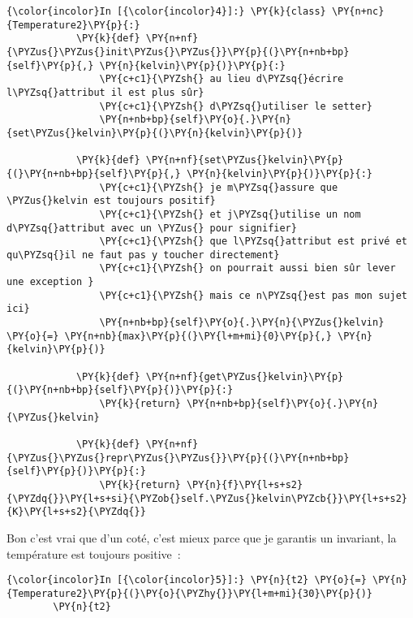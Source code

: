     \begin{Verbatim}[commandchars=\\\{\}]
{\color{incolor}In [{\color{incolor}4}]:} \PY{k}{class} \PY{n+nc}{Temperature2}\PY{p}{:}
            \PY{k}{def} \PY{n+nf}{\PYZus{}\PYZus{}init\PYZus{}\PYZus{}}\PY{p}{(}\PY{n+nb+bp}{self}\PY{p}{,} \PY{n}{kelvin}\PY{p}{)}\PY{p}{:}
                \PY{c+c1}{\PYZsh{} au lieu d\PYZsq{}écrire l\PYZsq{}attribut il est plus sûr}
                \PY{c+c1}{\PYZsh{} d\PYZsq{}utiliser le setter}
                \PY{n+nb+bp}{self}\PY{o}{.}\PY{n}{set\PYZus{}kelvin}\PY{p}{(}\PY{n}{kelvin}\PY{p}{)}
                
            \PY{k}{def} \PY{n+nf}{set\PYZus{}kelvin}\PY{p}{(}\PY{n+nb+bp}{self}\PY{p}{,} \PY{n}{kelvin}\PY{p}{)}\PY{p}{:}
                \PY{c+c1}{\PYZsh{} je m\PYZsq{}assure que \PYZus{}kelvin est toujours positif}
                \PY{c+c1}{\PYZsh{} et j\PYZsq{}utilise un nom d\PYZsq{}attribut avec un \PYZus{} pour signifier}
                \PY{c+c1}{\PYZsh{} que l\PYZsq{}attribut est privé et qu\PYZsq{}il ne faut pas y toucher directement}
                \PY{c+c1}{\PYZsh{} on pourrait aussi bien sûr lever une exception }
                \PY{c+c1}{\PYZsh{} mais ce n\PYZsq{}est pas mon sujet ici}
                \PY{n+nb+bp}{self}\PY{o}{.}\PY{n}{\PYZus{}kelvin} \PY{o}{=} \PY{n+nb}{max}\PY{p}{(}\PY{l+m+mi}{0}\PY{p}{,} \PY{n}{kelvin}\PY{p}{)}
                
            \PY{k}{def} \PY{n+nf}{get\PYZus{}kelvin}\PY{p}{(}\PY{n+nb+bp}{self}\PY{p}{)}\PY{p}{:}
                \PY{k}{return} \PY{n+nb+bp}{self}\PY{o}{.}\PY{n}{\PYZus{}kelvin}
                
            \PY{k}{def} \PY{n+nf}{\PYZus{}\PYZus{}repr\PYZus{}\PYZus{}}\PY{p}{(}\PY{n+nb+bp}{self}\PY{p}{)}\PY{p}{:}
                \PY{k}{return} \PY{n}{f}\PY{l+s+s2}{\PYZdq{}}\PY{l+s+si}{\PYZob{}self.\PYZus{}kelvin\PYZcb{}}\PY{l+s+s2}{K}\PY{l+s+s2}{\PYZdq{}}
\end{Verbatim}


    Bon c'est vrai que d'un coté, c'est mieux parce que je garantis un
invariant, la température est toujours positive~:

    \begin{Verbatim}[commandchars=\\\{\}]
{\color{incolor}In [{\color{incolor}5}]:} \PY{n}{t2} \PY{o}{=} \PY{n}{Temperature2}\PY{p}{(}\PY{o}{\PYZhy{}}\PY{l+m+mi}{30}\PY{p}{)}
        \PY{n}{t2}
\end{Verbatim}



